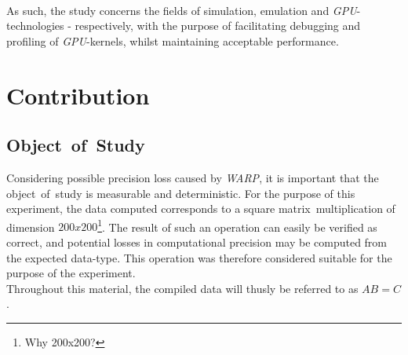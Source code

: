 \documentclass[fleqn,10pt]{SelfArx} %
\begin{document}
\\
As such, the study concerns the fields of simulation, emulation and \textit{GPU}-technologies - respectively, with the purpose of facilitating debugging and profiling of \textit{GPU}-kernels, whilst maintaining acceptable performance.

\section{Contribution}
\label{sec:contribution}

\subsection{Object~of~Study}
\label{sec:contribution:objectofstudy}
Considering possible precision loss caused by \textit{WARP}, it is important that the object~of~study is measurable and deterministic. For the purpose of this experiment, the data computed corresponds to a square matrix~multiplication of dimension $200x200$\footnote{Why 200x200?}. The result of such an operation can easily be verified as correct, and potential losses in computational precision may be computed from the expected data-type. This operation was therefore considered suitable for the purpose of the experiment.\\
Throughout this material, the compiled data will thusly be referred to as $AB=C$.
\end{document}
